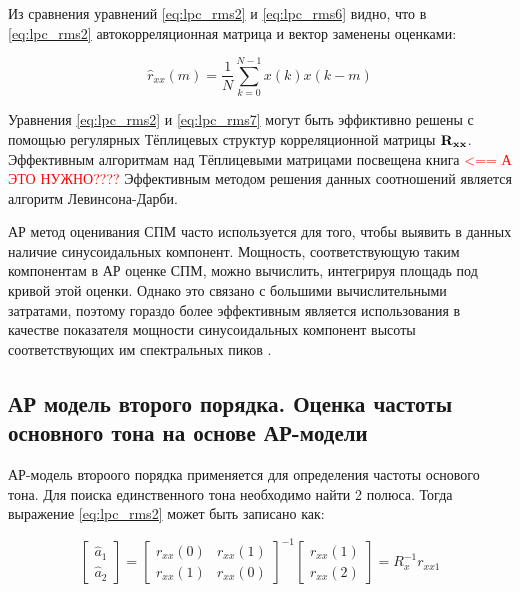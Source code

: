 Из сравнения уравнений \ref{eq:lpc_rms2} и \ref{eq:lpc_rms6} видно, что в \ref{eq:lpc_rms2}
автокорреляционная матрица и вектор заменены оценками:
\begin{center}
\begin{equation}
	\label{eq:lpc_rms7}
	\hat{r}_{xx}(m) = \frac{1}{N} \sum \limits_{k=0}^{N-1} x(k)x(k-m)
\end{equation}
\end{center}

Уравнения \ref{eq:lpc_rms2} и \ref{eq:lpc_rms7} могут быть эффиктивно решены с помощью регулярных
Тёплицевых структур корреляционной матрицы ${{\bf R_{xx}}}$. Эффективным алгоритмам над Тёплицевыми
матрицами посвещена книга \cite{bleyhut_book} \textcolor{red}{<== А ЭТО НУЖНО????} Эффективным методом решения
данных соотношений является алгоритм Левинсона-Дарби.

АР метод оценивания СПМ часто используется для того, чтобы выявить в данных наличие синусоидальных
компонент. Мощность, соответствующую  таким компонентам в АР оценке СПМ, можно вычислить, интегрируя
площадь под кривой этой оценки. Однако это связано с большими вычислительными затратами, поэтому
гораздо более эффективным является использования в качестве показателя мощности синусоидальных
компонент высоты соответствующих им спектральных пиков \cite{marpl_book}.  

\subsection{АР модель второго порядка. Оценка частоты основного тона на основе АР-модели}
АР-модель второого порядка применяется для определения частоты основого тона. Для поиска единственного
тона необходимо найти 2 полюса. Тогда выражение \ref{eq:lpc_rms2} может быть записано как:

\begin{center}
\begin{equation}
	\label{eq:lpc_gps_1}
	\left[ \begin{array}{c}
		\hat{a}_1 \\
		\hat{a}_2
	\end{array} \right]
	=
		\left[ \begin{array}{cc}
			r_{xx}(0) & r_{xx}(1) \\
			r_{xx}(1) & r_{xx}(0)
		\end{array} \right]^{-1}
		\left[ \begin{array}{c}
			r_{xx}(1) \\
			r_{xx}(2)
		\end{array} \right]
	= R_x^{-1}r_{xx1}
\end{equation}
\end{center}

